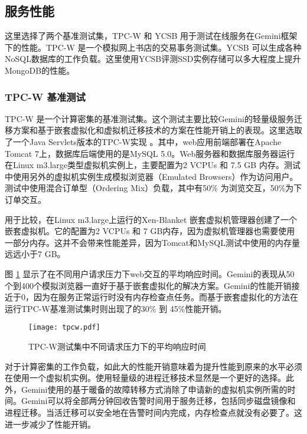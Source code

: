 \subsection{服务性能}
这里选择了两个基准测试集，TPC-W 和 YCSB 用于测试在线服务在Gemini框架下的性能。TPC-W 是一个模拟网上书店的交易事务测试集。YCSB 可以生成各种NoSQL数据库的工作负载。这里使用YCSB评测SSD实例存储可以多大程度上提升MongoDB的性能。

\subsubsection{TPC-W 基准测试}
TPC-W 是一个计算密集的基准测试集。这个测试主要比较Gemini的轻量级服务迁移方案和基于嵌套虚拟化和虚拟机迁移技术的方案在性能开销上的表现。这里选取了一个Java Servlets版本的TPC-W实现 \cite{JAVATPCW:2014}。其中，web应用前端部署在Apache Tomcat 7上，数据库后端使用的是MySQL 5.0。Web服务器和数据库服务器运行在Linux m3.large类型虚拟机实例上，主要配置为2 VCPUs 和 7.5 GB 内存。测试中使用另外的虚拟机实例生成模拟浏览器（Emulated Browsers）作为访问用户。测试中使用混合订单型（Ordering Mix）负载，其中有50\% 为浏览交互，50\%为下订单交互。

用于比较，在Linux m3.large上运行的Xen-Blanket \cite{Williams:2012:XVO:2168836.2168849} 嵌套虚拟机管理器创建了一个嵌套虚拟机。它的配置为2 VCPUs 和 7 GB内存，因为虚拟机管理器也需要使用一部分内存。这并不会带来性能差异，因为Tomcat和MySQL测试中使用的内存量远远小于7 GB。

图 \ref{figure:tpcw} 显示了在不同用户请求压力下web交互的平均响应时间。Gemini的表现从50个到400个模拟浏览器一直好于基于嵌套虚拟化的解决方案。Gemini的性能开销接近于0，因为在服务正常运行时没有内存检查点任务。而基于嵌套虚拟化的方法在运行TPC-W基准测试集时则出现了的30\% 到 45\%性能开销。
\begin{figure}[]
  \centering
  \texttt{[image: tpcw.pdf]}
  \caption{TPC-W测试集中不同请求压力下的平均响应时间}
  \label{figure:tpcw}
\end{figure}

对于计算密集的工作负载，如此大的性能开销意味着为提升性能到原来的水平必须在使用一个虚拟机实例。使用轻量级的进程迁移技术显然是一个更好的选择。此外，Gemini使用的基于暖备的故障转移方式消除了申请新的虚拟机实例所需的时间。Gemini可以将全部两分钟回收告警时间用于服务迁移，包括同步磁盘镜像和进程迁移。当活迁移可以安全地在告警时间内完成，内存检查点就没有必要了。这进一步减少了性能开销。

